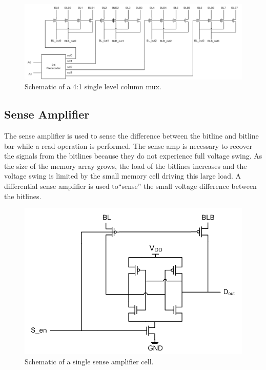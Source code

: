 \begin{figure}[h!]
\centering
\includegraphics[scale=.6]{./figs/4t1_single_level_column_mux.pdf}
\caption{Schematic of a 4:1 single level column mux.}
\label{fig:4t1_single_level_column_mux}
\end{figure}


\subsection{Sense Amplifier}
\label{sec:senseamp}
The sense amplifier is used to sense the difference between the
bitline and bitline bar while a read operation is performed.  The
sense amp is necessary to recover the signals from the bitlines
because they do not experience full voltage swing.  As the size of the
memory array grows, the load of the bitlines increases and the voltage
swing is limited by the small memory cell driving this large load.  A
differential sense amplifier is used to``sense'' the small voltage
difference between the bitlines.

\begin{figure}[h!]
\centering
\includegraphics[scale=.8]{./figs/sense_amp_schem.pdf}
\caption{Schematic of a single sense amplifier cell.}
\label{fig:sense_amp}
\end{figure}

